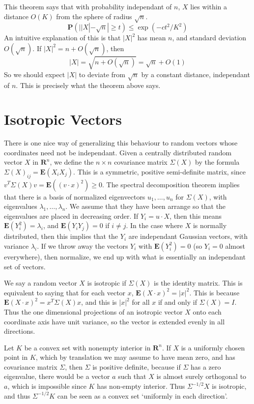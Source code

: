 This theorem says that with probability independant of $n$, $X$ lies within a distance $O(K)$ from the sphere of radius $\sqrt{n}$.
%
\[ \mathbf{P}(||X| - \sqrt{n}| \geq t) \leq \exp(- c t^2 / K^2) \]
%
An intuitive explanation of this is that $|X|^2$ has mean $n$, and standard deviation $O(\sqrt{n})$. If $|X|^2 = n + O(\sqrt{n})$, then
%
\[ |X| = \sqrt{n + O(\sqrt{n})} = \sqrt{n} + O(1) \]
%
So we should expect $|X|$ to deviate from $\sqrt{n}$ by a constant distance, independant of $n$. This is precisely what the theorem above says.

\section{Isotropic Vectors}

There is one nice way of generalizing this behaviour to random vectors whose coordinates need not be independant. Given a centrally distributed random vector $X$ in $\mathbf{R}^n$, we define the $n \times n$ covariance matrix $\Sigma(X)$ by the formula $\Sigma(X)_{ij} = \mathbf{E}(X_iX_j)$. This is a symmetric, positive semi-definite matrix, since $v^T \Sigma(X) v = \mathbf{E}((v \cdot x)^2) \geq 0$. The spectral decomposition theorem implies that there is a basis of normalized eigenvectors $u_1, \dots, u_n$ for $\Sigma(X)$, with eigenvalues $\lambda_1, \dots, \lambda_n$. We assume that they have been arrange so that the eigenvalues are placed in decreasing order. If $Y_i = u \cdot X$, then this means $\mathbf{E}(Y_i^2) = \lambda_i$, and $\mathbf{E}(Y_iY_j) = 0$ if $i \neq j$. In the case where $X$ is normally distributed, then this implies that the $Y_i$ are independant Gaussian vectors, with variance $\lambda_i$. If we throw away the vectors $Y_i$ with $\mathbf{E}(Y_i^2) = 0$ (so $Y_i = 0$ almost everywhere), then normalize, we end up with what is essentially an independant set of vectors.

We say a random vector $X$ is isotropic if $\Sigma(X)$ is the identity matrix. This is equivalent to saying that for each vector $x$, $\mathbf{E} (X \cdot x)^2 = |x|^2$. This is because $\mathbf{E} (X \cdot x)^2 = x^T \Sigma(X) x$, and this is $|x|^2$ for all $x$ if and only if $\Sigma(X) = I$. Thus the one dimensional projections of an isotropic vector $X$ onto each coordinate axis have unit variance, so the vector is extended evenly in all directions.

\begin{example}
    Let $K$ be a convex set with nonempty interior in $\mathbf{R}^n$. If $X$ is a uniformly chosen point in $K$, which by translation we may assume to have mean zero, and has covariance matrix $\Sigma$, then $\Sigma$ is positive definite, because if $\Sigma$ has a zero eigenvalue, there would be a vector $a$ such that $X$ is almost surely orthogonal to $a$, which is impossible since $K$ has non-empty interior. Thus $\Sigma^{-1/2} X$ is isotropic, and thus $\Sigma^{-1/2} K$ can be seen as a convex set `uniformly in each direction'.
\end{example}

